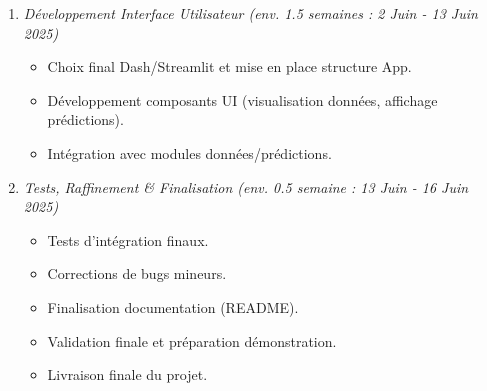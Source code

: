 \documentclass[11pt, a4paper]{article}
\newcommand{\endDate}{16 Juin 2025}
\begin{document}
\begin{enumerate}[label=Phase \arabic*:, wide, labelwidth=!, labelindent=0pt, leftmargin=*, itemsep=0.5em, font=\normalfont]
    \item \textit{Développement Interface Utilisateur (env. 1.5 semaines : 2 Juin - 13 Juin 2025)}
        \begin{itemize}[label=\textendash, itemsep=0.2em, leftmargin=*]
            \item Choix final Dash/Streamlit et mise en place structure App.
            \item Développement composants UI (visualisation données, affichage prédictions).
            \item Intégration avec modules données/prédictions.
        \end{itemize}

    \item \textit{Tests, Raffinement \& Finalisation (env. 0.5 semaine : 13 Juin - \endDate)}
        \begin{itemize}[label=\textendash, itemsep=0.2em, leftmargin=*]
            \item Tests d'intégration finaux.
            \item Corrections de bugs mineurs.
            \item Finalisation documentation (README).
            \item Validation finale et préparation démonstration.
            \item Livraison finale du projet.
        \end{itemize}
\end{enumerate}
\end{document}
